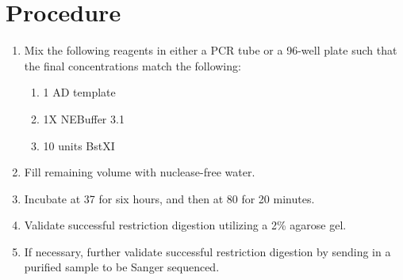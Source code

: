 \documentclass{ssiBio}
\begin{document}
\section{Procedure}
\begin{enumerate}
  \item{Mix the following reagents in either a PCR tube or a 96-well plate such that the final concentrations match the following:}
  \begin{enumerate}
    \item{1\ug{} AD template}
    \item{1X NEBuffer 3.1}
    \item{10 units BstXI}
  \end{enumerate}
  \item{Fill remaining volume with nuclease-free water.}
  \item{Incubate at 37\C{} for six hours, and then at 80\C{} for 20 minutes.}
  \stopPoint
  \item{Validate successful restriction digestion utilizing a 2\% agarose gel.}
  \item{If necessary, further validate successful restriction digestion by sending in a purified sample to be Sanger sequenced.}
\end{enumerate}



\end{document}
